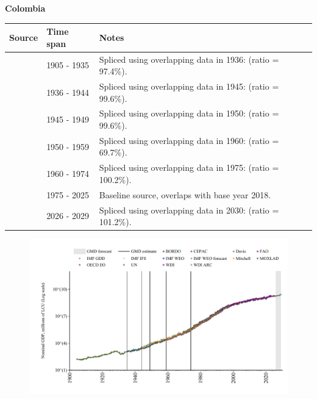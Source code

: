 \documentclass[12pt,a4paper,landscape]{article}
\begin{document}
\begin{adjustbox}{max totalsize={\paperwidth}{\paperheight},center}
\begin{minipage}[t][\textheight][t]{\textwidth}
\vspace*{0.5cm}
{}
\begin{center}
{\Large\bfseries Colombia}
\end{center}
\vspace{0.5cm}
\begin{table}[H]
\centering
\small
\begin{tabular}{|l|l|l|}
\hline
\textbf{Source} & \textbf{Time span} & \textbf{Notes} \\
\hline
\rowcolor{white}\cite{Davis}& 1905 - 1935 &Spliced using overlapping data in 1936: (ratio = 97.4\%).\\
\rowcolor{lightgray}\cite{MOXLAD}& 1936 - 1944 &Spliced using overlapping data in 1945: (ratio = 99.6\%).\\
\rowcolor{white}\cite{Mitchell}& 1945 - 1949 &Spliced using overlapping data in 1950: (ratio = 99.6\%).\\
\rowcolor{lightgray}\cite{IMF_GDD}& 1950 - 1959 &Spliced using overlapping data in 1960: (ratio = 69.7\%).\\
\rowcolor{white}\cite{WDI}& 1960 - 1974 &Spliced using overlapping data in 1975: (ratio = 100.2\%).\\
\rowcolor{lightgray}\cite{OECD_EO}& 1975 - 2025 &Baseline source, overlaps with base year 2018.\\
\rowcolor{white}\cite{IMF_WEO_forecast}& 2026 - 2029 &Spliced using overlapping data in 2030: (ratio = 101.2\%).\\
\hline
\end{tabular}
\end{table}
\begin{figure}[H]
\centering
\includegraphics[width=\textwidth,height=0.6\textheight,keepaspectratio]{graphs/COL_nGDP.pdf}
\end{figure}
\end{minipage}
\end{adjustbox}
\end{document}
